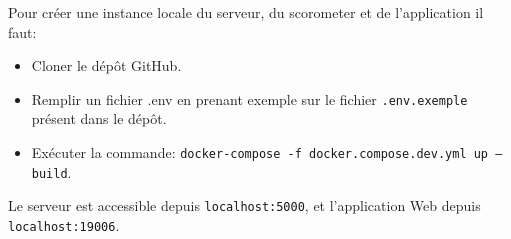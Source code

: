 Pour créer une instance locale du serveur, du scorometer et de l’application il faut:

\begin{itemize}
	\item Cloner le dépôt GitHub.
	\item Remplir un fichier .env en prenant exemple sur le fichier \verb|.env.exemple| présent dans le dépôt.
	\item Exécuter la commande: \verb|docker-compose -f docker.compose.dev.yml up –build|.
\end{itemize}


Le serveur est accessible depuis \verb|localhost:5000|, et l’application Web depuis \verb|localhost:19006|.

